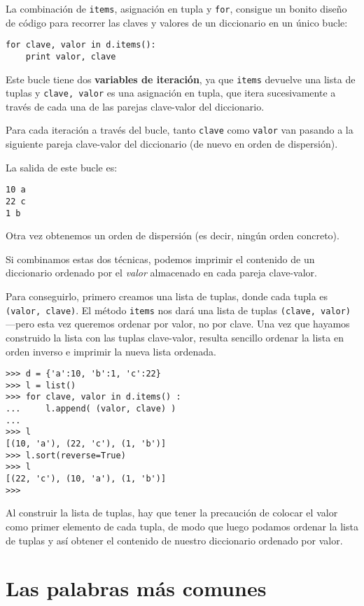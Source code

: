 La combinación de {\tt items}, asignación en tupla y {\tt for},
consigue un bonito diseño de código para recorrer las claves y valores
de un diccionario en un único bucle:

\beforeverb
\begin{verbatim}
for clave, valor in d.items():
    print valor, clave
\end{verbatim}
\afterverb
%
Este bucle tiene dos {\bf variables de iteración}, ya que {\tt items} devuelve
una lista de tuplas y {\tt clave, valor} es una asignación en tupla,
que itera sucesivamente a través de cada una de las parejas clave-valor del
diccionario.

Para cada iteración a través del bucle, tanto {\tt clave} como {\tt valor} van
pasando a la siguiente pareja clave-valor del diccionario
(de nuevo en orden de dispersión).

La salida de este bucle es:

\beforeverb
\begin{verbatim}
10 a
22 c
1 b
\end{verbatim}
\afterverb
%
Otra vez obtenemos un orden de dispersión (es decir, ningún orden concreto).

Si combinamos estas dos técnicas, podemos imprimir el contenido
de un diccionario ordenado por el \emph{valor} almacenado en cada pareja
clave-valor.

Para conseguirlo, primero creamos una lista de tuplas, donde cada tupla es
{\tt (valor, clave)}. El método {\tt items} nos dará una lista de
tuplas {\tt (clave, valor)}---pero esta vez queremos ordenar por valor, no
por clave. Una vez que hayamos construido la lista con las tuplas clave-valor,
resulta sencillo ordenar la lista en orden inverso e imprimir la nueva lista ordenada.

\beforeverb
\begin{verbatim}
>>> d = {'a':10, 'b':1, 'c':22}
>>> l = list()
>>> for clave, valor in d.items() :
...     l.append( (valor, clave) )
... 
>>> l
[(10, 'a'), (22, 'c'), (1, 'b')]
>>> l.sort(reverse=True)
>>> l
[(22, 'c'), (10, 'a'), (1, 'b')]
>>> 
\end{verbatim}
\afterverb
%
Al construir la lista de tuplas, hay que tener la precaución de colocar el valor
como primer elemento de cada tupla, de modo que luego podamos ordenar la lista de tuplas
y así obtener el contenido de nuestro diccionario ordenado por valor.

\section{Las palabras más comunes}

